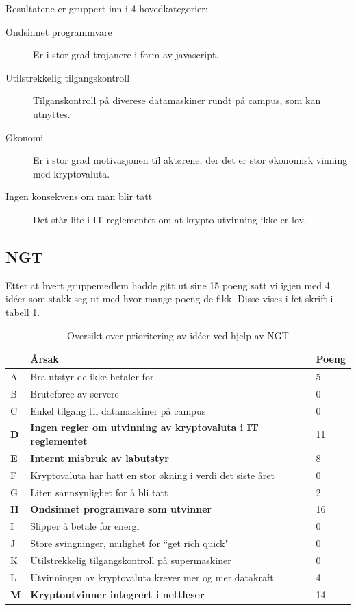 Resultatene er gruppert inn i 4 hovedkategorier:
\begin{description}
    \item [Ondsinnet programmvare] Er i stor grad trojanere i form av javascript.
    \item [Utilstrekkelig tilgangskontroll] Tilganskontroll på diverese datamaskiner rundt på campus, som kan utnyttes.
    \item [Økonomi] Er i stor grad motivasjonen til aktørene, der det er stor økonomisk vinning med kryptovaluta.
    \item[Ingen konsekvens om man blir tatt] Det står lite i IT-reglementet om at krypto utvinning ikke er lov.
\end{description}

\subsection{NGT}
Etter at hvert gruppemedlem hadde gitt ut sine 15 poeng satt vi igjen med 4 idéer som stakk seg ut med hvor mange poeng de fikk. Disse vises i fet skrift i tabell \ref{tab:NGT}. 

\begin{table} [H]
    \begin{tabular}{ | m{2em} | m{30em} | m{3em} | }
        \hline
            \cellcolor{yellow}  & \cellcolor{yellow} \textbf{Årsak} & \cellcolor{yellow} Poeng \\
        \hline
           A& Bra utstyr de ikke betaler for & 5 \\
        \hline
          B & Bruteforce av servere & 0 \\
        \hline
          C & Enkel tilgang til datamaskiner på campus & 0 \\
        \hline
         \textbf{D} & \textbf{Ingen regler om utvinning av kryptovaluta i IT reglementet} & 11 \\
        \hline
          \textbf{E} & \textbf{Internt misbruk av labutstyr} & 8  \\
        \hline
          F & Kryptovaluta har hatt en stor økning i verdi det siste året & 0 \\
        \hline
         G & Liten sannsynlighet for å bli tatt & 2 \\
        \hline
         \textbf{H} & \textbf{Ondsinnet programvare som utvinner} &  16 \\
        \hline
         I & Slipper å betale for energi & 0 \\
        \hline
         J & Store svingninger, mulighet for “get rich quick" & 0 \\
        \hline
         K & Utilstrekkelig tilgangskontroll på supermaskiner & 0 \\
        \hline
         L & Utvinningen av kryptovaluta krever mer og mer datakraft & 4 \\
        \hline
         \textbf{M} & \textbf{Kryptoutvinner integrert i nettleser} & 14 \\
        \hline
    \end{tabular}
    \caption{Oversikt over prioritering av idéer ved hjelp av NGT}
    \label{tab:NGT}
\end{table}

